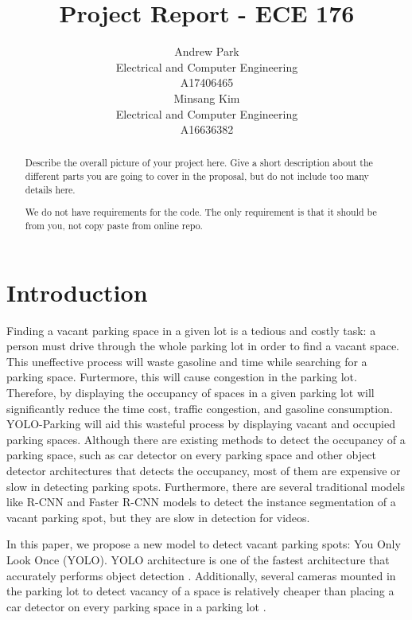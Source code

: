 \documentclass{article}
\title{Project Report - ECE 176}
\author{%
  Andrew Park \\
  Electrical and Computer Engineering\\
  A17406465\\
  \And
  Minsang Kim \\
  Electrical and Computer Engineering\\
  A16636382 \\
}
\begin{document}
\maketitle

\begin{abstract}
    Describe the overall picture of your project here. Give a short description about the different parts you are going to cover in the proposal, but do not include too many details here.
    
    We do not have requirements for the code. The only requirement is that it should be from you, not copy paste from online repo.
    

\end{abstract}

\section{Introduction}

Finding a vacant parking space in a given lot is a tedious and costly task: a person must drive through the whole parking lot in order to find a vacant space. This uneffective process will 
waste gasoline and time while searching for a parking space. Furtermore, this will cause congestion in the parking lot. Therefore, by displaying the occupancy of spaces in a given parking lot
will significantly reduce the time cost, traffic congestion, and gasoline consumption. YOLO-Parking will aid this wasteful process by displaying vacant and
occupied parking spaces. Although there are existing methods to detect the occupancy of a parking space, such as car detector on every parking space and other object detector architectures 
that detects the occupancy, most of them are expensive or slow in detecting parking spots\cite{DBLP:journals/corr/abs-2107-12207}. Furthermore, there are several traditional models like R-CNN and 
Faster R-CNN models to detect the instance segmentation of a vacant parking spot, but they are slow in detection for videos. 

In this paper, we propose a new model to detect vacant parking spots: You Only Look Once (YOLO). YOLO architecture is one of the fastest architecture that accurately performs object detection \cite{redmon2016look}. 
Additionally, several cameras mounted in the parking lot to detect vacancy of a space is relatively cheaper than placing a car detector on every parking space in a parking lot \cite{DBLP:journals/corr/abs-2107-12207}. 
\end{document}
